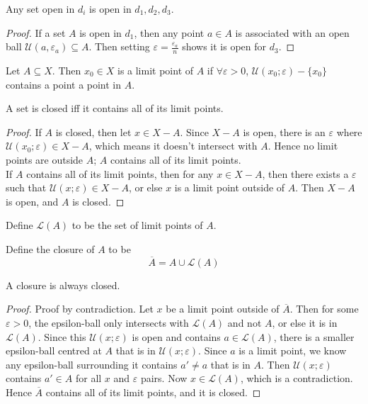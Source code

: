 \documentclass[12pt]{article}
\begin{document}
\begin{thm}
    Any set open in $d_i$ is open in $d_1,d_2,d_3$.
\end{thm}

\begin{proof}
    If a set $A$ is open in $d_1$, then any point $a \in A$ is associated with an open ball $\mathcal U(a,\varepsilon_a) \subseteq A$. Then setting $\varepsilon = \frac{\varepsilon_a}{n}$ shows it is open for $d_3$.
\end{proof}

\begin{defn}
    Let $A \subseteq X$. Then $x_0 \in X$ is a limit point of $A$ if $\forall \varepsilon > 0$, $\mathcal U(x_0;\varepsilon) - \{x_0\}$ contains a point a point in $A$.
\end{defn}

\begin{prop}
    A set is closed iff it contains all of its limit points.
\end{prop}

\begin{proof}
    If $A$ is closed, then let $x \in X - A$. Since $X-A$ is open, there is an $\varepsilon$ where $\mathcal U(x_0;\varepsilon) \in X-A$, which means it doesn't intersect with $A$. Hence no limit points are outside $A$; $A$ contains all of its limit points. \\
    If $A$ contains all of its limit points, then for any $x \in X-A$, then there exists a $\varepsilon$ such that $\mathcal U(x;\varepsilon) \in X-A$, or else $x$ is a limit point outside of $A$. Then $X-A$ is open, and $A$ is closed.
\end{proof}

\begin{defn}
    Define $\mathcal L(A)$ to be the set of limit points of $A$.
\end{defn}

\begin{defn}
    Define the closure of $A$ to be
    $$\overline A = A \cup \mathcal L(A)$$
\end{defn}

\begin{prop}
    A closure is always closed.
\end{prop}

\begin{proof}
    Proof by contradiction. Let $x$ be a limit point outside of $\overline A$. Then for some $\varepsilon > 0$, the epsilon-ball only intersects with $\mathcal L(A)$ and not $A$, or else it is in $\mathcal L(A)$. Since this $\mathcal U(x;\varepsilon)$ is open and contains $a \in \mathcal L(A)$, there is a smaller epsilon-ball centred at $A$ that is in $\mathcal U(x;\varepsilon)$. Since $a$ is a limit point, we know any epsilon-ball surrounding it contains $a' \neq a$ that is in $A$. Then $\mathcal U(x;\varepsilon)$ contains $a' \in A$ for all $x$ and $\varepsilon$ pairs. Now $x \in \mathcal L(A)$, which is a contradiction. Hence $\overline A$ contains all of its limit points, and it is closed.
\end{proof}
\end{document}
